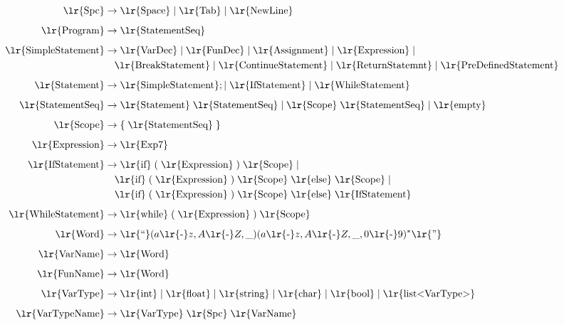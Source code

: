 \documentclass[a4paper,12pt]{article}
\begin{document}
\begin{align*}
\text{\lr{Spc}} &\rightarrow \text{\lr{Space}} \mid \text{\lr{Tab}} \mid \text{\lr{NewLine}} \\[0.5em]
\text{\lr{Program}} &\rightarrow \text{\lr{StatementSeq}} \\[0.5em]
\text{\lr{SimpleStatement}} &\rightarrow \text{\lr{VarDec}} \mid \text{\lr{FunDec}} \mid \text{\lr{Assignment}} \mid \text{\lr{Expression}} \mid \\
&\quad \text{\lr{BreakStatement}} \mid \text{\lr{ContinueStatement}} \mid \text{\lr{ReturnStatemnt}} \mid \text{\lr{PreDefinedStatement}} \\[0.5em]
\text{\lr{Statement}} &\rightarrow \text{\lr{SimpleStatement}}; \mid \text{\lr{IfStatement}} \mid \text{\lr{WhileStatement}} \\[0.5em]
\text{\lr{StatementSeq}} &\rightarrow \text{\lr{Statement}} \; \text{\lr{StatementSeq}} \mid \text{\lr{Scope}} \; \text{\lr{StatementSeq}} \mid \text{\lr{empty}} \\[0.5em]
\text{\lr{Scope}} &\rightarrow \{ \; \text{\lr{StatementSeq}} \; \} \\[0.5em]
\text{\lr{Expression}} &\rightarrow \text{\lr{Exp7}} \\[0.5em]
\text{\lr{IfStatement}} &\rightarrow \text{\lr{if}} \; ( \; \text{\lr{Expression}} \; ) \; \text{\lr{Scope}} \mid \\
&\quad \text{\lr{if}} \; ( \; \text{\lr{Expression}} \; ) \; \text{\lr{Scope}} \; \text{\lr{else}} \; \text{\lr{Scope}} \mid \\
&\quad \text{\lr{if}} \; ( \; \text{\lr{Expression}} \; ) \; \text{\lr{Scope}} \; \text{\lr{else}} \; \text{\lr{IfStatement}} \\[0.5em]
\text{\lr{WhileStatement}} &\rightarrow \text{\lr{while}} \; ( \; \text{\lr{Expression}} \; ) \; \text{\lr{Scope}} \\[0.5em]
\text{\lr{Word}} &\rightarrow \text{\lr{``}}(a\text{\lr{-}}z,A\text{\lr{-}}Z,\_)(a\text{\lr{-}}z,A\text{\lr{-}}Z,\_,0\text{\lr{-}}9)^*\text{\lr{''}} \\[0.5em]
\text{\lr{VarName}} &\rightarrow \text{\lr{Word}} \\[0.5em]
\text{\lr{FunName}} &\rightarrow \text{\lr{Word}} \\[0.5em]
\text{\lr{VarType}} &\rightarrow \text{\lr{int}} \mid \text{\lr{float}} \mid \text{\lr{string}} \mid \text{\lr{char}} \mid \text{\lr{bool}} \mid \text{\lr{list<VarType>}} \\[0.5em]
\text{\lr{VarTypeName}} &\rightarrow \text{\lr{VarType}} \; \text{\lr{Spc}} \; \text{\lr{VarName}} \\[0.5em]

\end{align*}
\end{document}
